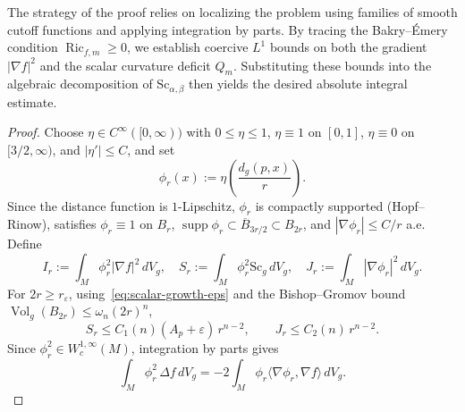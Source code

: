 \documentclass[12pt,oneside,a4paper]{article}
\theoremstyle{mytheorem}
\theoremstyle{remark}
\begin{document}
The strategy of the proof relies on localizing the problem using families of smooth cutoff functions and applying integration by parts. By tracing the Bakry--\'Emery condition $\operatorname{Ric}_{f,m}\geq 0$, we establish coercive $L^1$ bounds on both the gradient $|\nabla f|^2$ and the scalar curvature deficit $Q_m$. Substituting these bounds into the algebraic decomposition of $\mathrm{Sc}_{\alpha,\beta}$ then yields the desired absolute integral estimate.



\begin{proof}
Choose $\eta\in C^\infty([0,\infty))$ with $0\le\eta\le 1$,
$\eta\equiv 1$ on $[0,1]$, $\eta\equiv 0$ on $[3/2,\infty)$, and
$|\eta'|\le C$, and set
\[
  \phi_r(x):=\eta\!\left(\frac{d_g(p,x)}{r}\right).
\]
Since the distance function is $1$-Lipschitz, $\phi_r$ is compactly supported
(Hopf--Rinow), satisfies $\phi_r\equiv 1$ on $B_r$,
$\operatorname{supp}\phi_r\subset\overline B_{3r/2}\subset B_{2r}$, and
$|\nabla\phi_r|\le C/r$ a.e.
Define
\[
  I_r:=\int_M\phi_r^2|\nabla f|^2\,dV_g,\quad
  S_r:=\int_M\phi_r^2\mathrm{Sc}_g\,dV_g,\quad
  J_r:=\int_M|\nabla\phi_r|^2\,dV_g.
\]
For $2r\ge r_\varepsilon$, using~\eqref{eq:scalar-growth-eps} and the
Bishop--Gromov bound $\operatorname{Vol}_g(B_{2r})\le\omega_n(2r)^n$,
\begin{equation}\label{eq:SJ-growth}
  S_r\le C_1(n)(A_p+\varepsilon)\,r^{n-2},
  \qquad
  J_r\le C_2(n)\,r^{n-2}.
\end{equation}
Since $\phi_r^2\in W^{1,\infty}_c(M)$, integration by parts gives
\begin{equation}\label{eq:weak-ibp-cutoff}
  \int_M\phi_r^2\,\Delta f\,dV_g
  =-2\int_M\phi_r\langle\nabla\phi_r,\nabla f\rangle\,dV_g.
\end{equation}


\end{proof}
\end{document}
